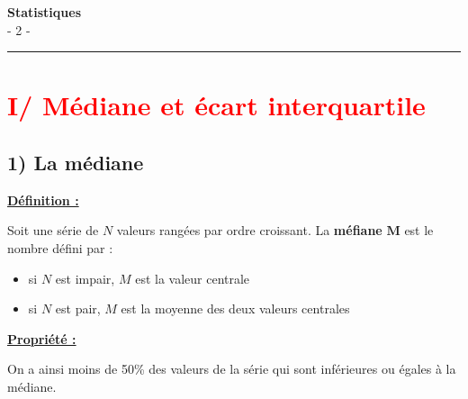 \documentclass[12pt]{article}
\begin{document}

\newpage

\begin{center}
    {\LARGE \textbf{Statistiques}}\\[4mm]
    {\large - 2 -}
\end{center}

\vspace{10pt}
\hrule
\vspace{0pt}


\section*{\textcolor{red}{I/ Médiane et écart interquartile}}

\subsection*{\hspace{1cm} 1) La médiane}

\vspace{5pt}

\begin{mdframed}[
    linewidth=1pt,
    roundcorner=5pt,
    linecolor=ForestGreen,
    innertopmargin=10pt,
    innerbottommargin=10pt
]
{\color{ForestGreen}
\textbf{\underline{Définition :}}}

Soit une série de $N$ valeurs rangées par ordre croissant. La \textbf{méfiane} $\bm{M}$ est le nombre défini 
par : 

\begin{itemize}
    \item si $N$ est impair, $M$ est la valeur centrale
    \item si $N$ est pair, $M$ est la moyenne des deux valeurs centrales
\end{itemize}

\end{mdframed}

\begin{mdframed}[
    linewidth=1pt,
    roundcorner=5pt,
    linecolor=Red,
    innertopmargin=10pt,
    innerbottommargin=10pt
]
{\color{red}
\textbf{\underline{Propriété :}}

\vspace{5pt}
On a ainsi moins de 50\% des valeurs de la série qui sont inférieures ou égales à la médiane.
}
\end{mdframed}
\end{document}
